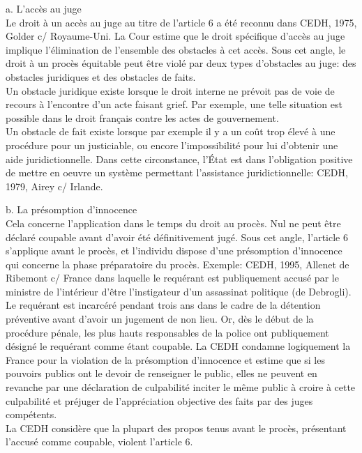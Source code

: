 \documentclass[10pt, a4paper, openany]{book}
\begin{document}
a. L'accès au juge \\
Le droit à un accès au juge au titre de l'article 6 a été reconnu dans CEDH, 1975, Golder c/ Royaume-Uni. La Cour estime que le droit spécifique d'accès au juge implique l'élimination de l'ensemble des obstacles à cet accès. Sous cet angle, le droit à un procès équitable peut être violé par deux types d'obstacles au juge: des obstacles juridiques et des obstacles de faits. \\
Un obstacle juridique existe lorsque le droit interne ne prévoit pas de voie de recours à l'encontre d'un acte faisant grief. Par exemple, une telle situation est possible dans le droit français contre les actes de gouvernement. \\
Un obstacle de fait existe lorsque par exemple il y a un coût trop élevé à une procédure pour un justiciable, ou encore l'impossibilité pour lui d'obtenir une aide juridictionnelle. Dans cette circonstance, l'État est dans l'obligation positive de mettre en oeuvre un système permettant l'assistance juridictionnelle: CEDH, 1979, Airey c/ Irlande. 


b. La présomption d'innocence \\
Cela concerne l'application dans le temps du droit au procès. Nul ne peut être déclaré coupable avant d'avoir été définitivement jugé. Sous cet angle, l'article 6 s'applique avant le procès, et l'individu dispose d'une présomption d'innocence qui concerne la phase préparatoire du procès. Exemple: CEDH, 1995, Allenet de Ribemont c/ France dans laquelle le requérant est publiquement accusé par le ministre de l'intérieur d'être l'instigateur d'un assassinat politique (de Debrogli). Le requérant est incarcéré pendant trois ans dans le cadre de la détention préventive avant d'avoir un jugement de non lieu. Or, dès le début de la procédure pénale, les plus hauts responsables de la police ont publiquement désigné le requérant comme étant coupable. La CEDH condamne logiquement la France pour la violation de la présomption d'innocence et estime que si les pouvoirs publics ont le devoir de renseigner le public, elles ne peuvent en revanche par une déclaration de culpabilité inciter le même public à croire à cette culpabilité et préjuger de l'appréciation objective des faits par des juges compétents. \\
La CEDH considère que la plupart des propos tenus avant le procès, présentant l'accusé comme coupable, violent l'article 6. 
\end{document}
